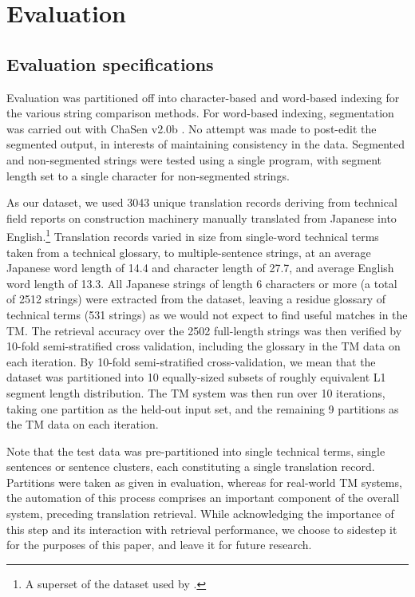 \section{Evaluation}
\label{sec:eval}


\subsection{Evaluation specifications}
\label{sec:evalspecs}

Evaluation was partitioned off into character-based and word-based
indexing for the various string comparison methods. For word-based indexing,
segmentation was carried out with ChaSen v2.0b . No
attempt was made to post-edit the segmented output, in interests of
maintaining consistency in the data. Segmented and non-segmented strings
were tested using a single program, with segment length set to a single
character for non-segmented strings.

As our dataset, we used 3043 unique translation records deriving from
technical field reports on construction machinery manually translated
from Japanese into English.\footnote{A superset of the dataset used by
  .} Translation records varied in size from
single-word technical terms taken from a technical glossary, to
multiple-sentence strings, at an average Japanese word length of 14.4
and character length of 27.7, and average English word length of 13.3.
All Japanese strings of length 6 characters or more (a total of 2512
strings) were extracted from the dataset, leaving a residue glossary of
technical terms (531 strings) as we would not expect to find useful
matches in the TM. The retrieval accuracy over the 2502 full-length
strings was then verified by 10-fold semi-stratified cross validation,
including the glossary in the TM data on each iteration. By 10-fold
semi-stratified cross-validation, we mean that the dataset was
partitioned into 10 equally-sized subsets of roughly equivalent L1
segment length distribution.  The TM system was then run over 10
iterations, taking one partition as the held-out input set, and the
remaining 9 partitions as the TM data on each iteration.

Note that the test data was pre-partitioned into single technical terms,
single sentences or sentence clusters, each constituting a single
translation record. Partitions were taken as given in evaluation,
whereas for real-world TM systems, the automation of this process
comprises an important component of the overall system, preceding
translation retrieval.  While acknowledging the importance of this step
and its interaction with retrieval performance, we choose to sidestep it
for the purposes of this paper, and leave it for future research.

